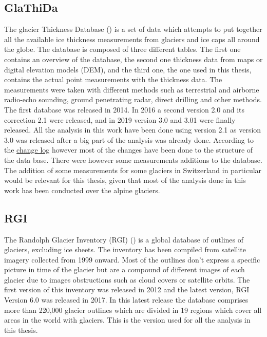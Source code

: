 \subsection{GlaThiDa}
The glacier Thickness Database (\citet{GlaThiDa2014}) is a set of data which attempts to put together all the available ice thickness measurements from glaciers and ice caps all around the globe. The database is composed of three different tables. The first one contains an overview of the database, the second one thickness data from maps or digital elevation models (DEM), and the third one, the one used in this thesis, contains the actual point measurements with the thickness data. The measurements were taken with different methods such as terrestrial and airborne radio-echo sounding, ground penetrating radar, direct drilling and other methods. The first database was released in 2014. In 2016 a second version 2.0 and its correction 2.1 were released, and in 2019 version 3.0 and 3.01 were finally released. All the analysis in this work have been done using version 2.1 as version 3.0 was released after a big part of the analysis was already done. According to the \href{https://github.com/ezwelty/glathida/blob/master/CHANGELOG.md}{change log} however most of the changes have been done to the structure of the data base. There were however some measurements additions to the database. The addition of some measurements for some glaciers in Switzerland in particular would be relevant for this thesis, given that most of the analysis done in this work has been conducted over the alpine glaciers. 

\subsection{RGI}
The Randolph Glacier Inventory (RGI) (\citet{RGI2014}) is a global database of outlines of glaciers, excluding ice sheets. The inventory has been compiled from satellite imagery collected from 1999 onward. Most of the outlines don't express a specific picture in time of the glacier but are a compound of different images of each glacier due to images obstructions such as cloud covers or satellite orbits. The first version of this inventory was released in 2012 and the latest version, RGI Version 6.0 was released in 2017. In this latest release the database comprises more than 220,000 glacier outlines which are divided in 19 regions which cover all areas in the world with glaciers. This is the version used for all the analysis in this thesis. 

